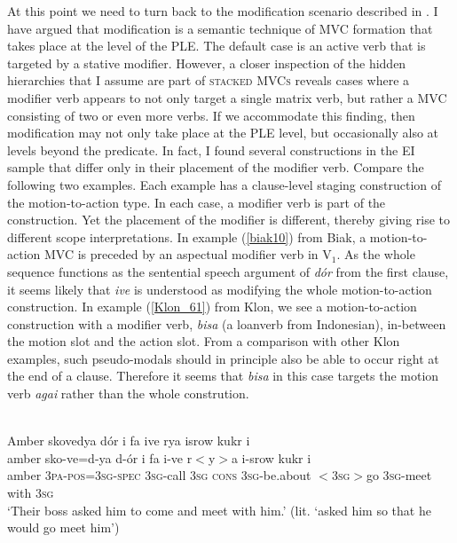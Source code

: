 At this point we need to turn back to the modification scenario described in . I have argued that modification is a semantic technique of MVC formation that takes place at the level of the PLE. The default case is an active verb that is targeted by a stative modifier. However, a closer inspection of the hidden hierarchies that I assume are part of \textsc{stacked MVCs} reveals cases where a modifier verb appears to not only target a single matrix verb, but rather a MVC consisting of two or even more verbs. If we accommodate this finding, then modification may not only take place at the PLE level, but occasionally also at levels beyond the predicate. In fact, I found several constructions in the EI sample that differ only in their placement of the modifier verb. Compare the following two examples. Each example has a clause-level staging construction of the motion-to-action type. In each case, a modifier verb is part of the construction. Yet the placement of the modifier is different, thereby giving rise to different scope interpretations. In example (\ref{biak10}) from Biak, a motion-to-action MVC is preceded by an aspectual modifier verb in V$_1$. As the whole sequence functions as the sentential speech argument of \textit{dór} from the first clause, it seems likely that \textit{ive} is understood as modifying the whole motion-to-action construction. In example (\ref{Klon_61}) from Klon, we see a motion-to-action construction with a modifier verb, \textit{bisa} (a loanverb from Indonesian), in-between the motion slot and the action slot. From a comparison with other Klon examples, such pseudo-modals should in principle also be able to occur right at the end of a clause. Therefore it seems that \textit{bisa} in this case targets the motion verb \textit{agai} rather than the whole constrution.
 
\ea \label{biak10}
\\
\glll Amber skovedya dór i fa ive rya isrow kukr i \\
amber sko-ve=d-ya d-ór i fa i-ve r$<$y$>$a i-srow kukr i \\
amber 3\textsc{pa}-\textsc{pos}=3\textsc{sg}-\textsc{spec} 3\textsc{sg}-call 3\textsc{sg} \textsc{cons} 3\textsc{sg}-be.about $<$3\textsc{sg}$>$go 3\textsc{sg}-meet with 3\textsc{sg}\\
\glft `Their boss asked him to come and meet with him.' (lit. `asked him so that he
would go meet him') \\ 
\z

